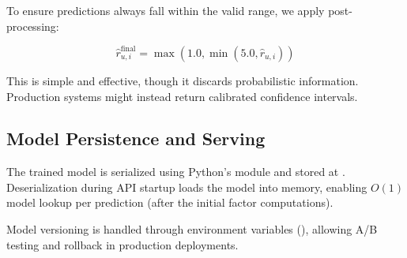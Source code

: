 To ensure predictions always fall within the valid range, we apply post-processing:

\[
  \hat{r}_{u,i}^{\text{final}} = \max(1.0, \min(5.0, \hat{r}_{u,i}))
\]

This is simple and effective, though it discards probabilistic information. Production systems might 
instead return calibrated confidence intervals.

\subsection{Model Persistence and Serving}

The trained model is serialized using Python's  module and stored at . 
Deserialization during API startup loads the model into memory, enabling $O(1)$ model lookup per prediction 
(after the initial factor computations).

Model versioning is handled through environment variables (), allowing A/B testing 
and rollback in production deployments.
